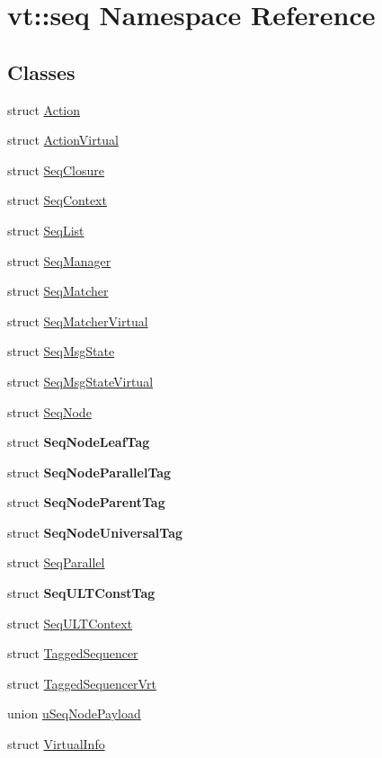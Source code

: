 \hypertarget{namespacevt_1_1seq}{}\section{vt\+:\+:seq Namespace Reference}
\label{namespacevt_1_1seq}
\subsection*{Classes}
\begin{DoxyCompactItemize}
\item 
struct \hyperlink{structvt_1_1seq_1_1_action}{Action}
\item 
struct \hyperlink{structvt_1_1seq_1_1_action_virtual}{Action\+Virtual}
\item 
struct \hyperlink{structvt_1_1seq_1_1_seq_closure}{Seq\+Closure}
\item 
struct \hyperlink{structvt_1_1seq_1_1_seq_context}{Seq\+Context}
\item 
struct \hyperlink{structvt_1_1seq_1_1_seq_list}{Seq\+List}
\item 
struct \hyperlink{structvt_1_1seq_1_1_seq_manager}{Seq\+Manager}
\item 
struct \hyperlink{structvt_1_1seq_1_1_seq_matcher}{Seq\+Matcher}
\item 
struct \hyperlink{structvt_1_1seq_1_1_seq_matcher_virtual}{Seq\+Matcher\+Virtual}
\item 
struct \hyperlink{structvt_1_1seq_1_1_seq_msg_state}{Seq\+Msg\+State}
\item 
struct \hyperlink{structvt_1_1seq_1_1_seq_msg_state_virtual}{Seq\+Msg\+State\+Virtual}
\item 
struct \hyperlink{structvt_1_1seq_1_1_seq_node}{Seq\+Node}
\item 
struct {\bfseries Seq\+Node\+Leaf\+Tag}
\item 
struct {\bfseries Seq\+Node\+Parallel\+Tag}
\item 
struct {\bfseries Seq\+Node\+Parent\+Tag}
\item 
struct {\bfseries Seq\+Node\+Universal\+Tag}
\item 
struct \hyperlink{structvt_1_1seq_1_1_seq_parallel}{Seq\+Parallel}
\item 
struct {\bfseries Seq\+U\+L\+T\+Const\+Tag}
\item 
struct \hyperlink{structvt_1_1seq_1_1_seq_u_l_t_context}{Seq\+U\+L\+T\+Context}
\item 
struct \hyperlink{structvt_1_1seq_1_1_tagged_sequencer}{Tagged\+Sequencer}
\item 
struct \hyperlink{structvt_1_1seq_1_1_tagged_sequencer_vrt}{Tagged\+Sequencer\+Vrt}
\item 
union \hyperlink{unionvt_1_1seq_1_1u_seq_node_payload}{u\+Seq\+Node\+Payload}
\item 
struct \hyperlink{structvt_1_1seq_1_1_virtual_info}{Virtual\+Info}
\end{DoxyCompactItemize}
